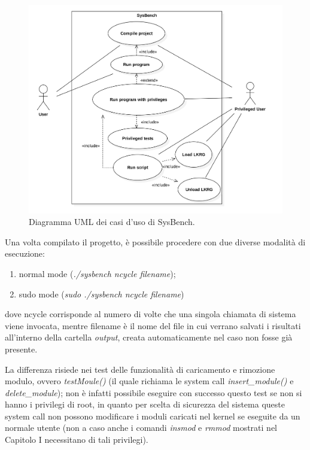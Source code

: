 \begin{figure}[!htbp]
\centering
\includegraphics[scale=0.28]{Figures/UseCase}
\caption[Diagramma UML dei casi d'uso di SysBench]{Diagramma UML dei casi d'uso di SysBench.}
\label{fig:UseCase}
\end{figure}

Una volta compilato il progetto, è possibile procedere con due diverse modalità di esecuzione:

\begin{enumerate}
\item normal mode (\emph{./sysbench ncycle filename});
\item sudo mode (\emph{sudo ./sysbench ncycle filename})
\end{enumerate}
dove ncycle corrisponde al numero di volte che una singola chiamata di sistema viene invocata, mentre filename è il nome del file in cui verrano salvati i risultati all'interno della cartella \emph{output}, creata automaticamente nel caso non fosse già presente.

La differenza risiede nei test delle funzionalità di caricamento e rimozione modulo, ovvero \emph{testMoule()} (il quale richiama le system call \emph{insert\_module()} e \emph{delete\_module}); non è infatti possibile eseguire con successo questo test se non si hanno i privilegi di root, in quanto per scelta di sicurezza del sistema queste system call non possono modificare i moduli caricati nel kernel se eseguite da un normale utente (non a caso anche i comandi \emph{insmod} e \emph{rmmod} mostrati nel Capitolo I necessitano di tali privilegi).

